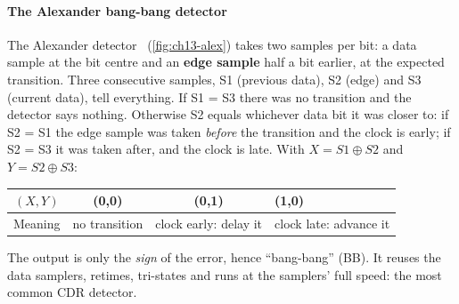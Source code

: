\paragraph{The Alexander bang-bang detector}
The Alexander detector~\cite{p5:alexander1975} (\cref{fig:ch13-alex}) takes two samples per bit: a data sample at the bit centre and an \textbf{edge sample} half a bit earlier, at the expected transition. Three consecutive samples, S1 (previous data), S2 (edge) and S3 (current data), tell everything. If S1 = S3 there was no transition and the detector says nothing. Otherwise S2 equals whichever data bit it was closer to: if S2 = S1 the edge sample was taken \emph{before} the transition and the clock is early; if S2 = S3 it was taken after, and the clock is late. With $X = S1\oplus S2$ and $Y = S2\oplus S3$:
\begin{center}\small
\begin{tabular}{cccl}
\toprule
$(X, Y)$ & (0,0) & (0,1) & (1,0) \\
\midrule
Meaning & no transition & clock early: delay it & clock late: advance it \\
\bottomrule
\end{tabular}
\end{center}
The output is only the \emph{sign} of the error, hence ``bang-bang'' (BB). It reuses the data samplers, retimes, tri-states and runs at the samplers' full speed: the most common CDR detector.

